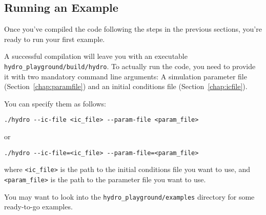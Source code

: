 







\subsection{Running an Example}


Once you've compiled the code following the steps in the previous sections,
you're ready to run your first example.

A successful compilation will leave you with an executable
\verb|hydro_playground/build/hydro|. To actually run the code, you need to
provide it with two mandatory command line arguments: A simulation parameter
file (Section~\ref{chap:paramfile}) and an initial conditions file
(Section~\ref{chap:icfile}).

You can specify them as follows:

\begin{lstlisting}
./hydro --ic-file <ic_file> --param-file <param_file>
\end{lstlisting}

or

\begin{lstlisting}
./hydro --ic-file=<ic_file> --param-file=<param_file>
\end{lstlisting}

where \verb|<ic_file>| is the path to the initial conditions file you want to
use, and \verb|<param_file>| is the path to the parameter file you want to use.

You may want to look into the \verb|hydro_playground/examples| directory for
some ready-to-go examples.




